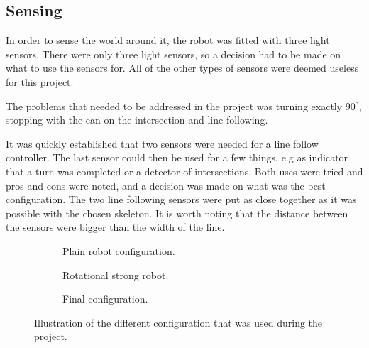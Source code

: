 \subsection{Sensing}\label{sec:sensing}
In order to sense the world around it, the robot was fitted with three light sensors. There were only three light sensors, so a decision had to be made on what to use the sensors for. All of the other types of sensors were deemed useless for this project.

The problems that needed to be addressed in the project was turning exactly $90^{\circ}$, stopping with the can on the intersection and line following.

It was quickly established that two sensors were needed for a line follow controller. The last sensor could then be used for a few things, e.g as indicator that a turn was completed or a detector of intersections. Both uses were tried and pros and cons were noted, and a decision was made on what was the best configuration. The two line following sensors were put as close together as it was possible with the chosen skeleton. It is worth noting that the distance between the sensors were bigger than the width of the line.

\begin{figure}[H]
 \begin{subfigure}{0.32\textwidth}
 \centering
  \caption{Plain robot configuration.}
  \label{subfig:plain_robot}
 \end{subfigure}
 \begin{subfigure}{0.32\textwidth}
 \centering
  \caption{Rotational strong robot.}
  \label{subfig:rot_robot}
 \end{subfigure}
 \begin{subfigure}{0.32\textwidth}
 \centering
  \caption{Final configuration.}
  \label{subfig:final_robot}
 \end{subfigure}
\caption{Illustration of the different configuration that was used during the project.}
\label{fig:line_follow}
\end{figure}

